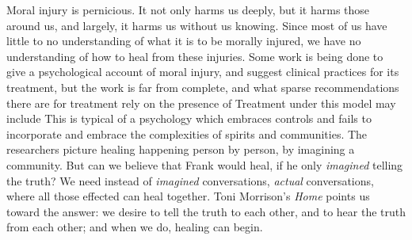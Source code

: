 \documentclass[12pt]{article}
\begin{document}
Moral injury is pernicious. It not only harms us deeply, but it harms those
around us, and largely, it harms us without us knowing. Since most of us have
little to no understanding of what it is to be morally injured, we have no
understanding of how to heal from these injuries. Some work is being done to
give a psychological account of moral injury, and suggest clinical practices
for its treatment,\autocite{Litz09} but the work is far from complete, and what
sparse recommendations there are for treatment rely on the presence of
\autocite[\S 7.2]{Litz09} Treatment under this
model may include \autocite[\S 7.2.5]{Litz09} This is typical of a psychology
which embraces controls and fails to incorporate and embrace the complexities
of spirits and communities. The researchers picture healing happening person by
person, by imagining a community. But can we believe that Frank would heal, if
he only \emph{imagined} telling the truth? We need instead of \emph{imagined}
conversations, \emph{actual} conversations, where all those effected can heal
together. Toni Morrison's \emph{Home} points us toward the answer: we desire to
tell the truth to each other, and to hear the truth from each other; and when
we do, healing can begin.



\clearpage
\printbibliography
\end{document}

